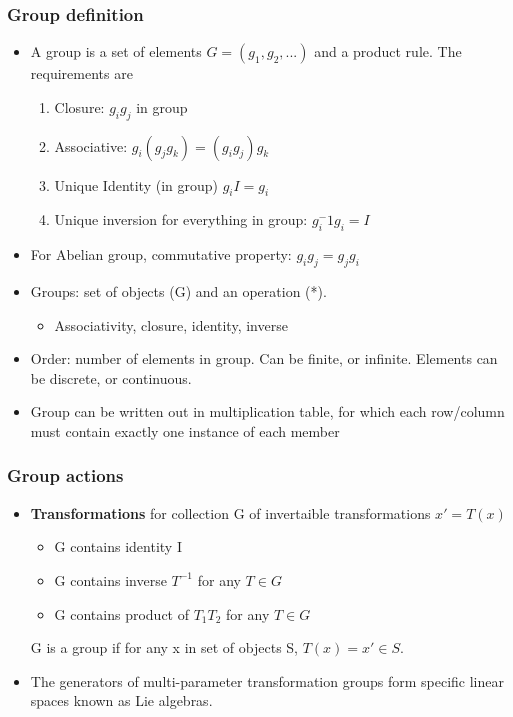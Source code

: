 \subsubsection{Group definition}
\begin{itemize}
    \item A group is a set of elements $G=(g_1,g_2,...)$ and a product rule. The requirements are \cite{wells}
    \begin{enumerate}
        \item Closure: $g_ig_j$ in group \cite{wells}
        \item Associative: $g_i(g_jg_k)=(g_ig_j)g_k$ \cite{wells}
        \item Unique Identity (in group) $g_iI=g_i$ \cite{wells}
        \item Unique inversion for everything in group: $g_i^-1g_i=I$ \cite{wells}
    \end{enumerate}
    \item For Abelian group, commutative property: $g_ig_j=g_jg_i$ \cite{wells}
    \item Groups: set of objects (G) and an operation (*). \cite{robinson}
    \begin{itemize}
        \item Associativity, closure, identity, inverse \cite{robinson}
    \end{itemize}
    \item Order: number of elements in group. Can be finite, or infinite. Elements can be discrete, or continuous. \cite{robinson}
    \item Group can be written out in multiplication table, for which each row/column must contain exactly one instance of each member \cite{robinson}
\end{itemize}

\subsubsection{Group actions}
\begin{itemize}
    \item \textbf{Transformations} for collection G of invertaible transformations $x'=T(x)$ \cite{ibragimov}
    \begin{itemize}
        \item G contains identity I \cite{ibragimov}
        \item G contains inverse $T^{-1}$ for any $T\in G$ \cite{ibragimov}
        \item G contains product of $T_1T_2$ for any $T\in G$ \cite{ibragimov}
    \end{itemize}
    G is a group if for any x in set of objects S, $T(x)=x'\in S$.
    \item The generators of multi-parameter transformation groups form specific linear spaces known as Lie algebras. \cite{ibragimov}
\end{itemize}

